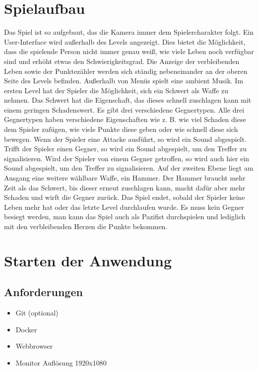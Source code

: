 \documentclass[12pt,a4paper]{article}
\begin{document}
\section{Spielaufbau}
Das Spiel ist so aufgebaut, das die Kamera immer dem Spielercharakter folgt. Ein User-Interface wird außerhalb des Levels angezeigt. Dies bietet die Möglichkeit, dass die spielende Person nicht immer genau weiß, wie viele Leben noch verfügbar sind und erhöht etwas den Schwierigkeitsgrad. Die Anzeige der verbleibenden Leben sowie der Punktezähler werden sich ständig nebeneinander an der oberen Seite des Levels befinden. Außerhalb von Menüs spielt eine ambient Musik. Im ersten Level hat der Spieler die Möglichkeit, sich ein Schwert als Waffe zu nehmen. Das Schwert hat die Eigenschaft, das dieses schnell zuschlagen kann mit einem geringen Schadenswert. Es gibt drei verschiedene Gegnertypen. Alle drei Gegnertypen haben verschiedene Eigenschaften wie z. B. wie viel Schaden diese dem Spieler zufügen, wie viele Punkte diese geben oder wie schnell diese sich bewegen. Wenn der Spieler eine Attacke ausführt, so wird ein Sound abgespielt. Trifft der Spieler einen Gegner, so wird ein Sound abgespielt, um den Treffer zu signalisieren. Wird der Spieler von einem Gegner getroffen, so wird auch hier ein Sound abgespielt, um den Treffer zu signalisieren. Auf der zweiten Ebene liegt am Ausgang eine weitere wählbare Waffe, ein Hammer. Der Hammer braucht mehr Zeit als das Schwert, bis dieser erneut zuschlagen kann, macht dafür aber mehr Schaden und wirft die Gegner zurück. Das Spiel endet, sobald der Spieler keine Leben mehr hat oder das letzte Level durchlaufen wurde. Es muss kein Gegner besiegt werden, man kann das Spiel auch als Pazifist durchspielen und lediglich mit den verbleibenden Herzen die Punkte bekommen.

\section{Starten der Anwendung}
\subsection{Anforderungen}
\begin{itemize}
    \item Git (optional)
    \item Docker
    \item Webbrowser
    \item Monitor Auflösung 1920x1080
\end{itemize}
\end{document}
